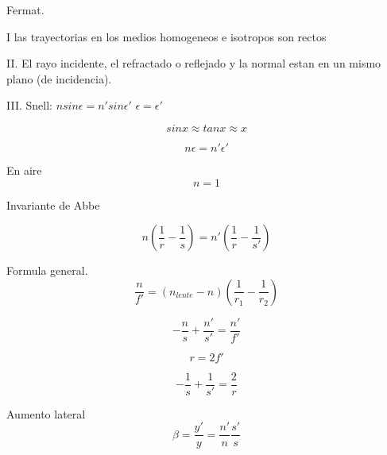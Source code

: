 \documentclass[12pt, letterpaper, twoside]{article}
\begin{document}
	Fermat.
	
	I las trayectorias en los medios homogeneos e isotropos son rectos
	
	II. El rayo incidente, el refractado o reflejado y la normal estan en un mismo plano (de incidencia).
	
	III. Snell: $n sin \epsilon = n' sin \epsilon'$
	$\epsilon = \epsilon'$
	
	\begin{equation}
		sin x \approx tan x \approx x 
	\end{equation}

	\begin{equation}
		n \epsilon = n' \epsilon'
	\end{equation}
	
	En aire
	\begin{equation}
		n = 1
	\end{equation}

	Invariante de Abbe
	
	\begin{equation}
		n ( \frac{1}{r} - \frac{1}{s} ) = n' (\frac{1}{r} - \frac{1}{s'} )
	\end{equation}

	Formula general.	
	\begin{equation}
		\frac{n}{f'} = (n_{lente} - n)(\frac{1}{r_1} - \frac{1}{r_2})
	\end{equation}

	\begin{equation}
		-\frac{n}{s} + \frac{n'}{s'} = \frac{n'}{f'}
	\end{equation}

	\begin{equation}
		r = 2f'
	\end{equation}

	\begin{equation}
		-\frac{1}{s} + \frac{1}{s'} = \frac{2}{r}
	\end{equation}
	
	Aumento lateral
	\begin{equation}
		\beta = \frac{y'}{y} = \frac{n'}{n} \frac{s'}{s}
	\end{equation}
	
	
\end{document}
